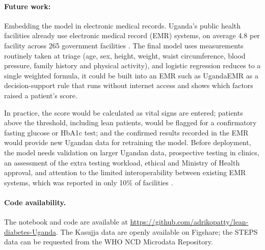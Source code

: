 \documentclass[11pt]{article}
\begin{document}
\paragraph{Future work:} 
Embedding the model in electronic medical records. Uganda's public health facilities already use electronic medical record (EMR) systems, on average 4.8 per facility across 265 government facilities \citep{ddamba2025}. The final model uses measurements routinely taken at triage (age, sex, height, weight, waist circumference, blood pressure, family history and physical activity), and logistic regression reduces to a single weighted formula, it could be built into an EMR such as UgandaEMR as a decision-support rule that runs without internet access and shows which factors raised a patient's score. 

In practice, the score would be calculated as vital signs are entered; patients above the threshold, including lean patients, would be flagged for a confirmatory fasting glucose or HbA1c test; and the confirmed results recorded in the EMR would provide new Ugandan data for retraining the model. Before deployment, the model needs validation on larger Ugandan data, prospective testing in clinics, an assessment of the extra testing workload, ethical and Ministry of Health approval, and attention to the limited interoperability between existing EMR systems, which was reported in only 10\% of facilities \citep{ddamba2025}.

\paragraph{Code availability.} The notebook and code are available at \url{https://github.com/adrikopatty/lean-diabetes-Uganda}. The Kasujja data are openly available on Figshare; the STEPS data can be requested from the WHO NCD Microdata Repository.


\end{document}
